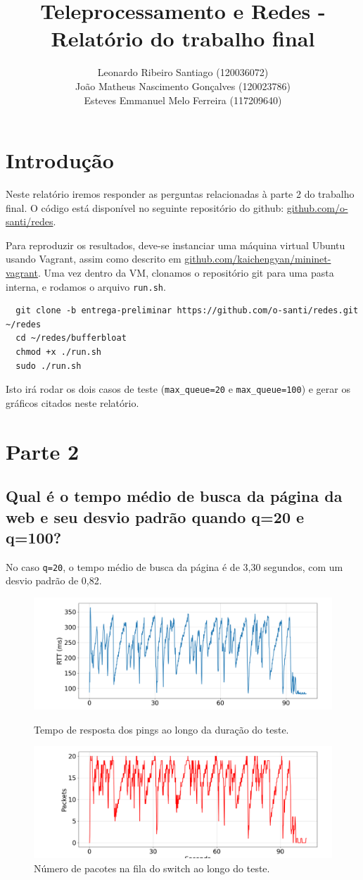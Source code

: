 \documentclass[a4paper,12pt]{article}
\title{Teleprocessamento e Redes - Relatório do trabalho final}
\author{
  Leonardo Ribeiro Santiago (120036072) \\
  João Matheus Nascimento Gonçalves (120023786) \\
  Esteves Emmanuel Melo Ferreira (117209640) }
\date{}
\newcommand{\code}[1]{\texttt{#1}}
\begin{document}
\maketitle

\section{Introdução}

Neste relatório iremos responder as perguntas relacionadas à parte 2 do trabalho final. O código está disponível no seguinte repositório do github: {\color{blue} \href{https://github.com/o-santi/redes}{github.com/o-santi/redes}}.

Para reproduzir os resultados, deve-se instanciar uma máquina virtual Ubuntu usando Vagrant, assim como descrito em {\color{blue} \href{https://github.com/kaichengyan/mininet-vagrant}{github.com/kaichengyan/mininet-vagrant}}. Uma vez dentro da VM, clonamos o repositório git para uma pasta interna, e rodamos o arquivo \code{run.sh}.
\begin{verbatim}
  git clone -b entrega-preliminar https://github.com/o-santi/redes.git ~/redes
  cd ~/redes/bufferbloat
  chmod +x ./run.sh
  sudo ./run.sh
\end{verbatim}

Isto irá rodar os dois casos de teste (\code{max\_queue=20} e \code{max\_queue=100}) e gerar os gráficos citados neste relatório.

\section{Parte 2}

\subsection{Qual é o tempo médio de busca da página da web e seu desvio padrão quando q=20 e q=100?}

No caso \code{q=20}, o tempo médio de busca da página é de 3,30 segundos, com um desvio padrão de 0,82.
\begin{figure}[h!]
  \centering
  \includegraphics[width=0.5\columnwidth]{./bufferbloat/reno-rtt-q20.png}
  \caption{Tempo de resposta dos pings ao longo da duração do teste.}
  \includegraphics[width=0.5\columnwidth]{./bufferbloat/reno-buffer-q20.png}
  \caption{Número de pacotes na fila do switch ao longo do teste.}
\end{figure}
\end{document}
